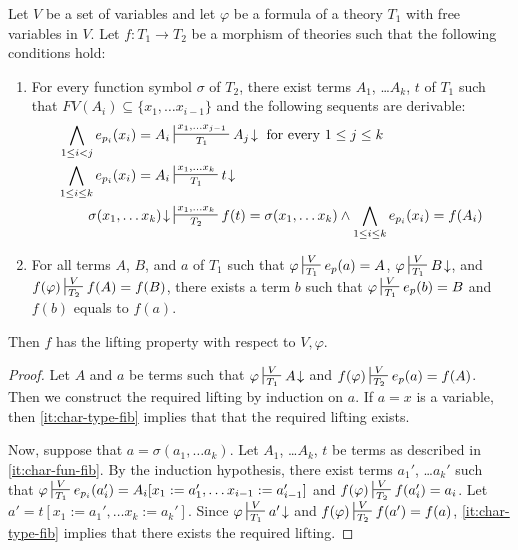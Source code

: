 \documentclass[reqno]{amsart}
\theoremstyle{definition}
\theoremstyle{remark}
\newcommand{\repl}{:=}
\numberwithin{figure}{section}
\begin{document}
\begin{lem}
Let $V$ be a set of variables and let $\varphi$ be a formula of a theory $T_1$ with free variables in $V$.
Let $f : T_1 \to T_2$ be a morphism of theories such that the following conditions hold:
\begin{enumerate}
\item \label{it:char-fun-fib} For every function symbol $\sigma$ of $T_2$, there exist terms $A_1$, \ldots $A_k$, $t$ of $T_1$ such that $FV(A_i) \subseteq \{ x_1, \ldots x_{i-1} \}$ and the following sequents are derivable:
\begin{align*}
\bigwedge_{1 \leq i < j} e_{p_i}(x_i) = A_i & \sststile{T_1}{x_1, \ldots x_{j-1}} A_j\!\downarrow \text{ for every } 1 \leq j \leq k \\
\bigwedge_{1 \leq i \leq k} e_{p_i}(x_i) = A_i & \sststile{T_1}{x_1, \ldots x_k} t\!\downarrow \\
\sigma(x_1, \ldots x_k)\!\downarrow & \sststile{T_2}{x_1, \ldots x_k} f(t) = \sigma(x_1, \ldots x_k) \land \bigwedge_{1 \leq i \leq k} e_{p_i}(x_i) = f(A_i)
\end{align*}
\item \label{it:char-type-fib} For all terms $A$, $B$, and $a$ of $T_1$ such that $\varphi \sststile{T_1}{V} e_p(a) = A$, $\varphi \sststile{T_1}{V} B\!\downarrow$, and $f(\varphi) \sststile{T_2}{V} f(A) = f(B)$,
there exists a term $b$ such that $\varphi \sststile{T_1}{V} e_p(b) = B$ and $f(b)$ equals to $f(a)$.
\end{enumerate}
Then $f$ has the lifting property with respect to $V,\varphi$.
\end{lem}
\begin{proof}
Let $A$ and $a$ be terms such that $\varphi \sststile{T_1}{V} A\!\downarrow$ and $f(\varphi) \sststile{T_2}{V} e_p(a) = f(A)$.
Then we construct the required lifting by induction on $a$.
If $a = x$ is a variable, then \eqref{it:char-type-fib} implies that that the required lifting exists.

Now, suppose that $a = \sigma(a_1, \ldots a_k)$.
Let $A_1$, \ldots $A_k$, $t$ be terms as described in \eqref{it:char-fun-fib}.
By the induction hypothesis, there exist terms $a_1'$, \ldots $a_k'$ such that $\varphi \sststile{T_1}{V} e_{p_i}(a_i') = A_i[x_1 \repl a_1', \ldots x_{i-1} \repl a_{i-1}']$ and $f(\varphi) \sststile{T_2}{V} f(a_i') = a_i$.
Let $a' = t[x_1 \repl a_1', \ldots x_k \repl a_k']$.
Since $\varphi \sststile{T_1}{V} a'\!\downarrow$ and $f(\varphi) \sststile{T_2}{V} f(a') = f(a)$, \eqref{it:char-type-fib} implies that there exists the required lifting.
\end{proof}
\end{document}
